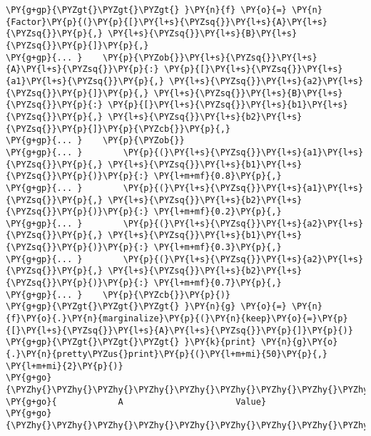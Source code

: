 \begin{fulllineitems}
\begin{fulllineitems}
\begin{Verbatim}[commandchars=\\\{\}]
\PY{g+gp}{\PYZgt{}\PYZgt{}\PYZgt{} }\PY{n}{f} \PY{o}{=} \PY{n}{Factor}\PY{p}{(}\PY{p}{[}\PY{l+s}{\PYZsq{}}\PY{l+s}{A}\PY{l+s}{\PYZsq{}}\PY{p}{,} \PY{l+s}{\PYZsq{}}\PY{l+s}{B}\PY{l+s}{\PYZsq{}}\PY{p}{]}\PY{p}{,}
\PY{g+gp}{... }    \PY{p}{\PYZob{}}\PY{l+s}{\PYZsq{}}\PY{l+s}{A}\PY{l+s}{\PYZsq{}}\PY{p}{:} \PY{p}{[}\PY{l+s}{\PYZsq{}}\PY{l+s}{a1}\PY{l+s}{\PYZsq{}}\PY{p}{,} \PY{l+s}{\PYZsq{}}\PY{l+s}{a2}\PY{l+s}{\PYZsq{}}\PY{p}{]}\PY{p}{,} \PY{l+s}{\PYZsq{}}\PY{l+s}{B}\PY{l+s}{\PYZsq{}}\PY{p}{:} \PY{p}{[}\PY{l+s}{\PYZsq{}}\PY{l+s}{b1}\PY{l+s}{\PYZsq{}}\PY{p}{,} \PY{l+s}{\PYZsq{}}\PY{l+s}{b2}\PY{l+s}{\PYZsq{}}\PY{p}{]}\PY{p}{\PYZcb{}}\PY{p}{,}
\PY{g+gp}{... }    \PY{p}{\PYZob{}}
\PY{g+gp}{... }        \PY{p}{(}\PY{l+s}{\PYZsq{}}\PY{l+s}{a1}\PY{l+s}{\PYZsq{}}\PY{p}{,} \PY{l+s}{\PYZsq{}}\PY{l+s}{b1}\PY{l+s}{\PYZsq{}}\PY{p}{)}\PY{p}{:} \PY{l+m+mf}{0.8}\PY{p}{,}
\PY{g+gp}{... }        \PY{p}{(}\PY{l+s}{\PYZsq{}}\PY{l+s}{a1}\PY{l+s}{\PYZsq{}}\PY{p}{,} \PY{l+s}{\PYZsq{}}\PY{l+s}{b2}\PY{l+s}{\PYZsq{}}\PY{p}{)}\PY{p}{:} \PY{l+m+mf}{0.2}\PY{p}{,}
\PY{g+gp}{... }        \PY{p}{(}\PY{l+s}{\PYZsq{}}\PY{l+s}{a2}\PY{l+s}{\PYZsq{}}\PY{p}{,} \PY{l+s}{\PYZsq{}}\PY{l+s}{b1}\PY{l+s}{\PYZsq{}}\PY{p}{)}\PY{p}{:} \PY{l+m+mf}{0.3}\PY{p}{,}
\PY{g+gp}{... }        \PY{p}{(}\PY{l+s}{\PYZsq{}}\PY{l+s}{a2}\PY{l+s}{\PYZsq{}}\PY{p}{,} \PY{l+s}{\PYZsq{}}\PY{l+s}{b2}\PY{l+s}{\PYZsq{}}\PY{p}{)}\PY{p}{:} \PY{l+m+mf}{0.7}\PY{p}{,}
\PY{g+gp}{... }    \PY{p}{\PYZcb{}}\PY{p}{)}
\PY{g+gp}{\PYZgt{}\PYZgt{}\PYZgt{} }\PY{n}{g} \PY{o}{=} \PY{n}{f}\PY{o}{.}\PY{n}{marginalize}\PY{p}{(}\PY{n}{keep}\PY{o}{=}\PY{p}{[}\PY{l+s}{\PYZsq{}}\PY{l+s}{A}\PY{l+s}{\PYZsq{}}\PY{p}{]}\PY{p}{)}
\PY{g+gp}{\PYZgt{}\PYZgt{}\PYZgt{} }\PY{k}{print} \PY{n}{g}\PY{o}{.}\PY{n}{pretty\PYZus{}print}\PY{p}{(}\PY{l+m+mi}{50}\PY{p}{,} \PY{l+m+mi}{2}\PY{p}{)}
\PY{g+go}{\PYZhy{}\PYZhy{}\PYZhy{}\PYZhy{}\PYZhy{}\PYZhy{}\PYZhy{}\PYZhy{}\PYZhy{}\PYZhy{}\PYZhy{}\PYZhy{}\PYZhy{}\PYZhy{}\PYZhy{}\PYZhy{}\PYZhy{}\PYZhy{}\PYZhy{}\PYZhy{}\PYZhy{}\PYZhy{}\PYZhy{}\PYZhy{}\PYZhy{}\PYZhy{}\PYZhy{}\PYZhy{}\PYZhy{}\PYZhy{}\PYZhy{}\PYZhy{}\PYZhy{}\PYZhy{}\PYZhy{}\PYZhy{}\PYZhy{}\PYZhy{}\PYZhy{}\PYZhy{}\PYZhy{}\PYZhy{}\PYZhy{}\PYZhy{}\PYZhy{}\PYZhy{}\PYZhy{}\PYZhy{}\PYZhy{}\PYZhy{}}
\PY{g+go}{            A                      Value}
\PY{g+go}{\PYZhy{}\PYZhy{}\PYZhy{}\PYZhy{}\PYZhy{}\PYZhy{}\PYZhy{}\PYZhy{}\PYZhy{}\PYZhy{}\PYZhy{}\PYZhy{}\PYZhy{}\PYZhy{}\PYZhy{}\PYZhy{}\PYZhy{}\PYZhy{}\PYZhy{}\PYZhy{}\PYZhy{}\PYZhy{}\PYZhy{}\PYZhy{}\PYZhy{}\PYZhy{}\PYZhy{}\PYZhy{}\PYZhy{}\PYZhy{}\PYZhy{}\PYZhy{}\PYZhy{}\PYZhy{}\PYZhy{}\PYZhy{}\PYZhy{}\PYZhy{}\PYZhy{}\PYZhy{}\PYZhy{}\PYZhy{}\PYZhy{}\PYZhy{}\PYZhy{}\PYZhy{}\PYZhy{}\PYZhy{}\PYZhy{}\PYZhy{}}

\end{Verbatim}
\end{fulllineitems}
\end{fulllineitems}
